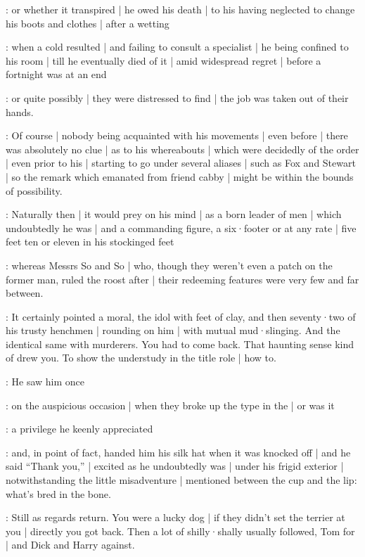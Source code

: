 :
or whether it transpired |
he owed his death |
to his having neglected to change his boots and clothes |
after a wetting

:
when a cold resulted |
and failing to consult a specialist |
he being confined to his room |
till he eventually died of it |
amid widespread regret |
before a fortnight was at an end

:
or quite possibly |
they were distressed to find |
the job was taken out of their hands.

:
Of course |
nobody being acquainted with his movements |
even before |
there was absolutely no clue |
as to his whereabouts |
which were decidedly of the  order |
even prior to his |
starting to go under several aliases |
such as Fox and Stewart |
so the remark which emanated from friend cabby |
might be within the bounds of possibility.

:
Naturally then |
it would prey on his mind |
as a born leader of men |
which undoubtedly he was |
and a commanding figure,
a six·footer or at any rate |
five feet ten or eleven in his stockinged feet

:
whereas Messrs So and So |
who,
though they weren't even a patch on the former man,
ruled the roost after |
their redeeming features were very few and far between.

:
It certainly pointed a moral,
the idol with feet of clay,%
and then seventy·two of his trusty henchmen |
rounding on him |
with mutual mud·slinging.
And the identical same with murderers.
You had to come back.
That haunting sense kind of drew you.
To show the understudy in the title role |
how to.

:
He saw him once

:
on the auspicious occasion |
when they broke up the type in the  |
or was it 

:
a privilege he keenly appreciated

:
and,
in point of fact,
handed him his silk hat when it was knocked off |
and he said “Thank you,” |
excited as he undoubtedly was |
under his frigid exterior |
notwithstanding the little misadventure |
mentioned between the cup and the lip:
what's bred in the bone.

:
Still as regards return.
You were a lucky dog |
if they didn't set the terrier at you |
directly you got back.
Then a lot of shilly·shally usually followed,
Tom for |
and Dick and Harry against.

